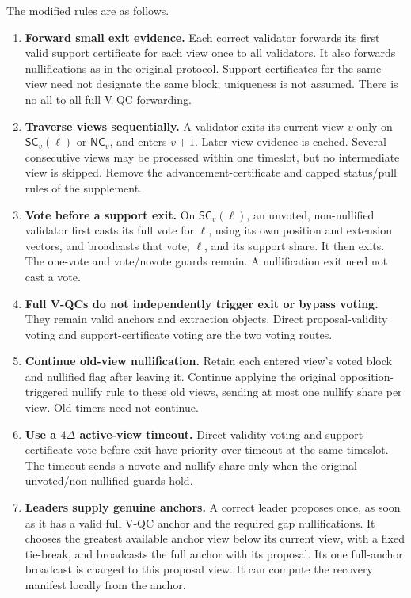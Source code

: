 \documentclass[11pt,a4paper]{article}
\theoremstyle{definition}
\newcommand{\SC}{\mathsf{SC}}
\newcommand{\NC}{\mathsf{NC}}
\begin{document}
The modified rules are as follows.
\begin{enumerate}[label=\textbf{P\arabic*.}]
\item \textbf{Forward small exit evidence.} Each correct validator forwards
  its first valid support certificate for each view once to all validators.
  It also forwards nullifications as in the original protocol. Support
  certificates for the same view need not designate the same block;
  uniqueness is not assumed. There is no all-to-all full-V-QC forwarding.
\item \textbf{Traverse views sequentially.} A validator exits its current
  view \(v\) only on \(\SC_v(\ell)\) or \(\NC_v\), and enters \(v+1\).
  Later-view evidence is cached. Several consecutive views may be processed
  within one timeslot, but no intermediate view is skipped. Remove the
  advancement-certificate and capped status/pull rules of the supplement.
\item \textbf{Vote before a support exit.} On \(\SC_v(\ell)\), an unvoted,
  non-nullified validator first casts its full vote for \(\ell\), using its
  own position and extension vectors, and broadcasts that vote, \(\ell\),
  and its support share. It then exits. The one-vote and vote/novote guards
  remain. A nullification exit need not cast a vote.
\item \textbf{Full V-QCs do not independently trigger exit or bypass voting.}
  They remain valid anchors and extraction objects. Direct proposal-validity
  voting and support-certificate voting are the two voting routes.
\item \textbf{Continue old-view nullification.} Retain each entered view's
  voted block and nullified flag after leaving it. Continue applying the
  original opposition-triggered nullify rule to these old views, sending
  at most one nullify share per view. Old timers need not continue.
\item \textbf{Use a \(4\Delta\) active-view timeout.} Direct-validity voting
  and support-certificate vote-before-exit have priority over timeout at
  the same timeslot. The timeout sends a novote and nullify share only when
  the original unvoted/non-nullified guards hold.
\item \textbf{Leaders supply genuine anchors.} A correct leader proposes
  once, as soon as it has a valid full V-QC anchor and the required gap
  nullifications. It chooses the greatest available anchor view below its
  current view, with a fixed tie-break, and broadcasts the full anchor with
  its proposal. Its one full-anchor broadcast is charged to this proposal
  view. It can compute the recovery manifest locally from the anchor.
\end{enumerate}
\end{document}
